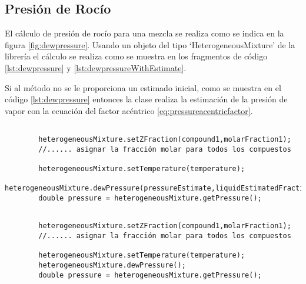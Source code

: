 \subsection{Presión de Rocío}\label{subsec:dewpressure}

	El cálculo de presión de rocío para una mezcla se realiza como se indica en la figura \ref{fig:dewpressure}. Usando un objeto del tipo `HeterogeneousMixture' de la librería \Materia el cálculo se realiza como se muestra en los fragmentos de código \ref{lst:dewpressure} y \ref{lst:dewpressureWithEstimate}.

	Si al método no se le proporciona un estimado inicial, como se muestra en el código \ref{lst:dewpressure} entonces la clase realiza la estimación de la presión de vapor con la ecuación del factor acéntrico \ref{eq:pressureacentricfactor}. 

	\begin{lstlisting}[label={lst:dewpressureWithEstimate},caption={Cálculo de la presión de rocío proporcionando un estimado inicial.}]

		heterogeneousMixture.setZFraction(compound1,molarFraction1);
		//...... asignar la fracción molar para todos los compuestos

		heterogeneousMixture.setTemperature(temperature);
		heterogeneousMixture.dewPressure(pressureEstimate,liquidEstimatedFractions);
		double pressure = heterogeneousMixture.getPressure();
	\end{lstlisting}

	\begin{lstlisting}[label={lst:dewpressure},caption={Cálculo de la presión de rocío.}]

		heterogeneousMixture.setZFraction(compound1,molarFraction1);
		//...... asignar la fracción molar para todos los compuestos

		heterogeneousMixture.setTemperature(temperature);
		heterogeneousMixture.dewPressure();
		double pressure = heterogeneousMixture.getPressure();
	\end{lstlisting}
